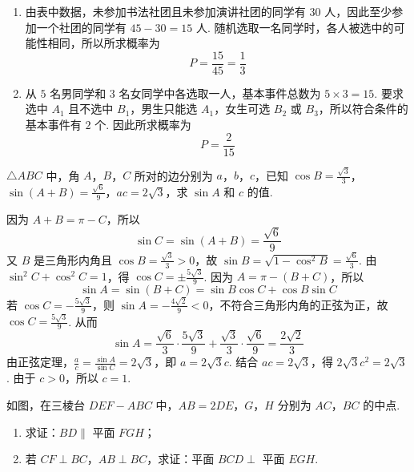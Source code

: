 \begin{solution}
\begin{enumerate}
\item 由表中数据，未参加书法社团且未参加演讲社团的同学有 \(30\) 人，因此至少参加一个社团的同学有 \(45-30=15\) 人. 随机选取一名同学时，各人被选中的可能性相同，所以所求概率为
\[
P=\frac{15}{45}=\frac13
\]

\item 从 \(5\) 名男同学和 \(3\) 名女同学中各选取一人，基本事件总数为 \(5\times3=15\). 要求选中 \(A_1\) 且不选中 \(B_1\)，男生只能选 \(A_1\)，女生可选 \(B_2\) 或 \(B_3\)，所以符合条件的基本事件有 \(2\) 个. 因此所求概率为
\[
P=\frac{2}{15}
\]
\end{enumerate}
\end{solution}

\begin{problem}
\(\triangle ABC\) 中，角 \(A\)，\(B\)，\(C\) 所对的边分别为 \(a\)，\(b\)，\(c\)，已知 \(\cos B = \frac{\sqrt{3}}{3}\)，\(\sin (A + B) = \frac{\sqrt{6}}{9}\)，\(ac = 2\sqrt{3}\)，求 \(\sin A\) 和 \(c\) 的值.
\end{problem}

\begin{solution}
因为 \(A+B=\pi-C\)，所以
\[
\sin C=\sin(A+B)=\frac{\sqrt6}{9}
\]
又 \(B\) 是三角形内角且 \(\cos B=\frac{\sqrt3}{3}>0\)，故
\(\sin B=\sqrt{1-\cos^2B}=\frac{\sqrt6}{3}\). 由 \(\sin^2C+\cos^2C=1\)，得
\(\cos C=\pm\frac{5\sqrt3}{9}\). 因为 \(A=\pi-(B+C)\)，所以
\[
\sin A=\sin(B+C)=\sin B\cos C+\cos B\sin C
\]
若 \(\cos C=-\frac{5\sqrt3}{9}\)，则 \(\sin A=-\frac{4\sqrt2}{9}<0\)，不符合三角形内角的正弦为正，故 \(\cos C=\frac{5\sqrt3}{9}\). 从而
\[
\sin A=\frac{\sqrt6}{3}\cdot\frac{5\sqrt3}{9}+\frac{\sqrt3}{3}\cdot\frac{\sqrt6}{9}=\frac{2\sqrt2}{3}
\]
由正弦定理，\(\frac{a}{c}=\frac{\sin A}{\sin C}=2\sqrt3\)，即 \(a=2\sqrt3c\). 结合 \(ac=2\sqrt3\)，得 \(2\sqrt3c^2=2\sqrt3\). 由于 \(c>0\)，所以 \(c=1\).
\end{solution}

\begin{problem}
如图，在三棱台 \(DEF - ABC\) 中，\(AB = 2DE\)，\(G\)，\(H\) 分别为 \(AC\)，\(BC\) 的中点.

\begin{enumerate}
\item 求证：\(BD \parallel\) 平面 \(FGH\)；
\item 若 \(CF \perp BC\)，\(AB \perp BC\)，求证：平面 \(BCD \perp\) 平面 \(EGH\).
\end{enumerate}

\end{problem}

